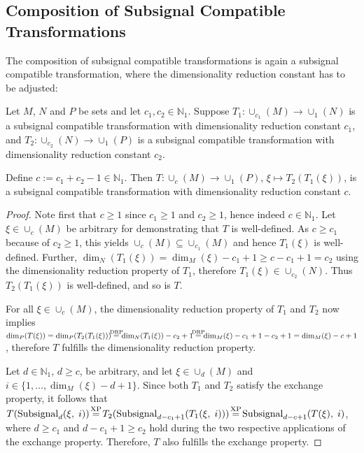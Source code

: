 \documentclass[journal]{IEEEtran}
\newcommand{\N}{\mathbb{N}}
\newcommand{\discint}[2]{\{#1,\dotsc,#2\}}
\newcommand{\inint}[2]{\in\discint{#1}{#2}}
\DeclareMathOperator{\Subsignal}{Subsignal}
\newcommand{\equsing}[1]{\overset{\mathclap{\text{#1}}}{=}}
\begin{document}
\subsection{Composition of Subsignal Compatible Transformations}
The composition of subsignal compatible transformations is again a subsignal compatible transformation, where the dimensionality reduction constant has to be adjusted:
\begin{theorem}
\label{thm:sscomp-composition}
Let $M$, $N$ and $P$ be sets and let $c_1,c_2\in\N_1$.
Suppose $T_1\colon \cup_{c_1}(M) \to \cup_1(N)$ is a subsignal compatible transformation with dimensionality reduction constant $c_1$, and $T_2\colon \cup_{c_2}(N) \to \cup_1(P)$ is a subsignal compatible transformation with dimensionality reduction constant $c_2$.

Define $c := c_1 + c_2 - 1\in\N_1$.
Then $T\colon\cup_c(M)\to\cup_1(P)$, $\xi\mapsto T_2(T_1(\xi))$, is a subsignal compatible transformation with dimensionality reduction constant $c$.
\end{theorem}
\begin{proof}
Note first that $c\geq 1$ since $c_1\geq 1$ and $c_2\geq 1$, hence indeed $c\in\N_1$.
Let $\xi\in\cup_c(M)$ be arbitrary for demonstrating that $T$ is well-defined.
As $c\geq c_1$ because of $c_2\geq 1$, this yields $\cup_c(M) \subseteq\cup_{c_1}(M)$ and hence $T_1(\xi)$ is well-defined.
Further, $\dim_N(T_1(\xi)) = \dim_M(\xi) - c_1 + 1 \geq c - c_1 + 1 = c_2$ using the dimensionality reduction property of $T_1$, therefore $T_1(\xi)\in\cup_{c_2}(N)$.
Thus $T_2(T_1(\xi))$ is well-defined, and so is $T$.

For all $\xi\in\cup_c(M)$, the dimensionality reduction property of $T_1$ and $T_2$ now implies
$\dim_P(T(\xi)) = \dim_P(T_2(T_1(\xi))) \equsing{DRP} \dim_N(T_1(\xi)) - c_2 + 1 \equsing{DRP} \dim_M(\xi) - c_1 + 1 - c_2 + 1 = \dim_M(\xi) - c + 1$,
therefore $T$ fulfills the dimensionality reduction property.

Let $d\in\N_1$, $d\geq c$, be arbitrary, and let $\xi\in\cup_d(M)$ and $i\inint{1}{\dim_M(\xi) - d + 1}$.
Since both $T_1$ and $T_2$ satisfy the exchange property, it follows that
$T(\Subsignal_d(\xi,\;i)) \equsing{XP} T_2(\Subsignal_{d - c_1 + 1}(T_1(\xi,\;i))) \equsing{XP} \Subsignal_{d - c + 1}(T(\xi),\;i)$,
where $d\geq c_1$ and $d - c_1 + 1 \geq c_2$ hold during the two respective applications of the exchange property.
Therefore, $T$ also fulfills the exchange property.
\end{proof}
\end{document}
